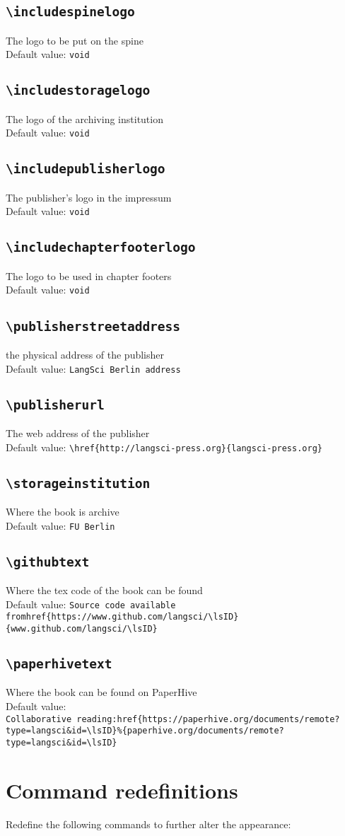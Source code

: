 \documentclass[%
output=guidelines,guidelines]{../langscibook}
\newcommand{\option}[3]{\subsection{\texttt{#1}}{#2}\\Default value: {\texttt{#3}}}
\begin{document}
\option{{\textbackslash}includespinelogo}{The logo to be put on the spine}{void}
\option{{\textbackslash}includestoragelogo}{The logo of the archiving institution}{void}
\option{{\textbackslash}includepublisherlogo}{The publisher's logo in the impressum}{void}
\option{{\textbackslash}includechapterfooterlogo}{The logo to be used in chapter footers}{void}

\option{{\textbackslash}publisherstreetaddress}{the physical address of the publisher}{LangSci Berlin address}
\option{{\textbackslash}publisherurl}{The web address of the publisher}{\textbackslash href\{http://langsci-press.org\}\{langsci-press.org\}}
\option{{\textbackslash}storageinstitution}{Where the book is archive}{FU Berlin}
\option{{\textbackslash}githubtext}{Where the tex code of the book can be found}{Source code available from\newline {\textbackslash}href\{https://www.github.com/langsci/{\textbackslash}lsID\}\{www.github.com/langsci/{\textbackslash}lsID\}}
\option{{\textbackslash}paperhivetext}{Where the book can be found on PaperHive}{Collaborative~reading:\newline{\textbackslash}href\{https://paperhive.org/documents/remote?type=langsci\&id={\textbackslash}lsID\}\%\newline\{paperhive.org/documents/remote?type=langsci\&id={\textbackslash}lsID\}}


\section{Command redefinitions}
Redefine the following commands to further alter the appearance:
\end{document}
